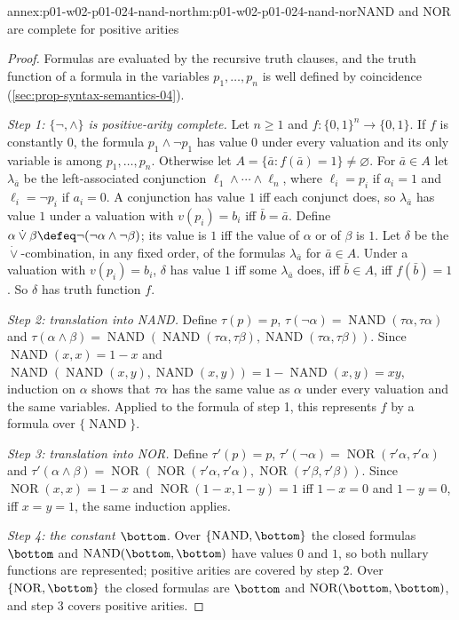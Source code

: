 \begin{annexitem}{annex:p01-w02-p01-024-nand-nor}{thm:p01-w02-p01-024-nand-nor}{NAND and NOR are complete for positive arities}
\begin{proof}
Formulas are evaluated by the recursive truth clauses, and the truth
function of a formula in the variables \(p_1,\ldots,p_n\) is well defined
by coincidence (\cref{sec:prop-syntax-semantics-04}).

\emph{Step 1: \(\{\neg,\land\}\) is positive-arity complete.}  Let
\(n\geq1\) and \(f:\{0,1\}^n\to\{0,1\}\).  If \(f\) is constantly \(0\),
the formula \(p_1\land\neg p_1\) has value \(0\) under every valuation and
its only variable is among \(p_1,\ldots,p_n\).  Otherwise let
\(A=\{\bar a:f(\bar a)=1\}\neq\varnothing\).  For \(\bar a\in A\) let
\(\lambda_{\bar a}\) be the left-associated conjunction
\(\ell_1\land\cdots\land\ell_n\), where \(\ell_i=p_i\) if \(a_i=1\) and
\(\ell_i=\neg p_i\) if \(a_i=0\).  A conjunction has value \(1\) iff each
conjunct does, so \(\lambda_{\bar a}\) has value \(1\) under a valuation
with \(v(p_i)=b_i\) iff \(\bar b=\bar a\).  Define
\(\alpha\mathbin{\dot\lor}\beta\defeq\neg(\neg\alpha\land\neg\beta)\); its
value is \(1\) iff the value of \(\alpha\) or of \(\beta\) is \(1\).  Let
\(\delta\) be the \(\dot\lor\)-combination, in any fixed order, of the
formulas \(\lambda_{\bar a}\) for \(\bar a\in A\).  Under a valuation with
\(v(p_i)=b_i\), \(\delta\) has value \(1\) iff some \(\lambda_{\bar a}\)
does, iff \(\bar b\in A\), iff \(f(\bar b)=1\).  So \(\delta\) has truth
function \(f\).

\emph{Step 2: translation into NAND.}  Define \(\tau(p)=p\),
\(\tau(\neg\alpha)=\operatorname{NAND}(\tau\alpha,\tau\alpha)\) and
\(\tau(\alpha\land\beta)=\operatorname{NAND}(\operatorname{NAND}(\tau\alpha,
\tau\beta),\operatorname{NAND}(\tau\alpha,\tau\beta))\).  Since
\(\operatorname{NAND}(x,x)=1-x\) and
\(\operatorname{NAND}(\operatorname{NAND}(x,y),\operatorname{NAND}(x,y))
=1-\operatorname{NAND}(x,y)=xy\), induction on \(\alpha\) shows that
\(\tau\alpha\) has the same value as \(\alpha\) under every valuation and
the same variables.  Applied to the formula of step 1, this represents
\(f\) by a formula over \(\{\operatorname{NAND}\}\).

\emph{Step 3: translation into NOR.}  Define \(\tau'(p)=p\),
\(\tau'(\neg\alpha)=\operatorname{NOR}(\tau'\alpha,\tau'\alpha)\) and
\(\tau'(\alpha\land\beta)=\operatorname{NOR}(\operatorname{NOR}(\tau'\alpha,
\tau'\alpha),\operatorname{NOR}(\tau'\beta,\tau'\beta))\).  Since
\(\operatorname{NOR}(x,x)=1-x\) and \(\operatorname{NOR}(1-x,1-y)=1\) iff
\(1-x=0\) and \(1-y=0\), iff \(x=y=1\), the same induction applies.

\emph{Step 4: the constant \(\bottom\).}  Over
\(\{\operatorname{NAND},\bottom\}\) the closed formulas \(\bottom\) and
\(\operatorname{NAND}(\bottom,\bottom)\) have values \(0\) and \(1\), so both
nullary functions are represented; positive arities are covered by step 2.
Over \(\{\operatorname{NOR},\bottom\}\) the closed formulas are \(\bottom\)
and \(\operatorname{NOR}(\bottom,\bottom)\), and step 3 covers positive
arities.
\end{proof}
\end{annexitem}

